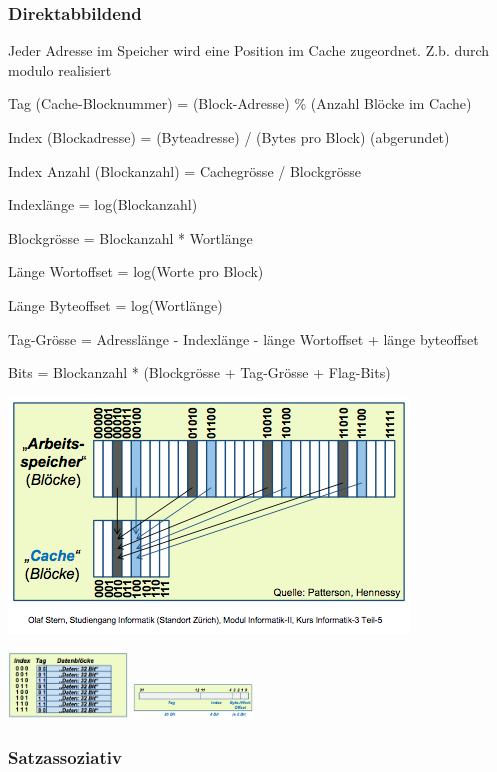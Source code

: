\subsubsection{Direktabbildend}

Jeder Adresse im Speicher wird eine Position im Cache zugeordnet. Z.b. durch modulo realisiert

Tag (Cache-Blocknummer) = (Block-Adresse) \% (Anzahl Blöcke im Cache)

Index (Blockadresse) = (Byteadresse) / (Bytes pro Block) (abgerundet)

Index Anzahl (Blockanzahl) = Cachegrösse / Blockgrösse

Indexlänge = log(Blockanzahl)

Blockgrösse = Blockanzahl * Wortlänge

Länge Wortoffset = log(Worte pro Block)

Länge Byteoffset = log(Wortlänge)

Tag-Grösse  = Adresslänge - Indexlänge - länge Wortoffset + länge byteoffset

Bits = Blockanzahl * (Blockgrösse + Tag-Grösse + Flag-Bits)

\includegraphics[width=\linewidth]{direktabbildend.png}

\includegraphics[width=120px]{direktabbildend2.png}
\includegraphics[width=120px]{direktabbildend3.png}

\subsubsection{Satzassoziativ}


